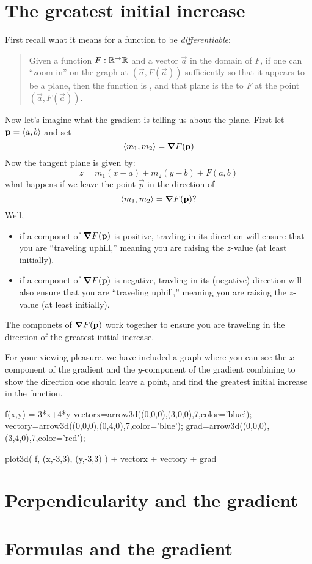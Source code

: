 \documentclass{ximera}
\begin{document}
\section{The greatest initial increase}

First recall what it means for a function to be \textit{differentiable}:
\begin{quote}%
  Given a function $F:\mathbb R^\to\mathbb R$ and a vector $\vec{a}$ in the domain
  of $F$, if one can ``zoom in'' on the graph at $(\vec{a}, F(\vec{a}))$
  sufficiently so that it appears to be a plane, then the
  function is , and that plane is the 
  to $F$ at the point $(\vec{a},F(\vec{a}))$.
\end{quote}

Now let's imagine what the gradient is telling us about the
plane. First let $\mathbf{p}=\left\langle a,b\right\rangle$ and set
\[
\left\langle m_1,m_2\right\rangle = \boldsymbol\nabla F(\mathbf{p})
\]
Now the tangent plane is given by: 
\[
z = m_1 (x-a) + m_2 (y-b) + F(a,b)
\]
what happens if we leave the point $\vec{p}$ in the direction of
\[
\left\langle m_1,m_2\right\rangle = \boldsymbol\nabla F(\mathbf{p})?
\]
Well,
\begin{itemize}
  \item if a componet of $\boldsymbol\nabla F(\mathbf{p})$ is positive, travling in
    its direction will ensure that you are ``traveling uphill,''
    meaning you are raising the $z$-value (at least initially).
\item if a componet of $\boldsymbol\nabla F(\mathbf{p})$ is negative, travling in its
  (negative) direction will also ensure that you are ``traveling
  uphill,'' meaning you are raising the $z$-value (at least
  initially).
\end{itemize}
The componets of $\boldsymbol\nabla F(\mathbf{p})$ work together to ensure you are
traveling in the direction of the greatest initial increase.
\begin{onlineOnly}
For your viewing pleasure, we have included a graph where you can see
the $x$-component of the gradient and the $y$-component of the
gradient combining to show the direction one should leave a point, and
find the greatest initial increase in the function.
\begin{sageCell}
f(x,y) = 3*x+4*y
vectorx=arrow3d((0,0,0),(3,0,0),7,color='blue');
vectory=arrow3d((0,0,0),(0,4,0),7,color='blue');
grad=arrow3d((0,0,0),(3,4,0),7,color='red');

plot3d( f, (x,-3,3), (y,-3,3) ) + vectorx + vectory + grad
\end{sageCell}
\end{onlineOnly}


\section{Perpendicularity and the gradient}

\section{Formulas and the gradient}
\end{document}
